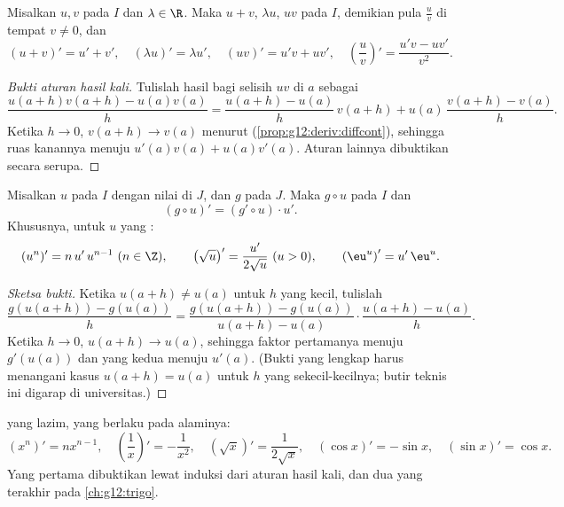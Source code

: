 \begin{proposition}[Operasi]\label{prop:g12:deriv:operations}
Misalkan $u, v$  pada $I$ dan $\lambda \in \R$. Maka $u + v$,
$\lambda u$, $uv$  pada $I$, demikian pula $\frac{u}{v}$ di tempat
$v \neq 0$, dan
\[
(u+v)' = u' + v', \quad (\lambda u)' = \lambda u', \quad
(uv)' = u'v + uv', \quad
\left(\frac{u}{v}\right)' = \frac{u'v - uv'}{v^2}.
\]
\end{proposition}

\begin{proof}[Bukti aturan hasil kali]
Tulislah hasil bagi selisih $uv$ di $a$ sebagai
\[
\frac{u(a+h)v(a+h) - u(a)v(a)}{h}
= \frac{u(a+h) - u(a)}{h}\,v(a+h) + u(a)\,\frac{v(a+h) - v(a)}{h}.
\]
Ketika $h \to 0$, $v(a+h) \to v(a)$ menurut 
(\cref{prop:g12:deriv:diffcont}), sehingga ruas kanannya menuju
$u'(a)v(a) + u(a)v'(a)$. Aturan lainnya dibuktikan secara serupa.
\end{proof}

\begin{theorem}\label{thm:g12:deriv:chain}
Misalkan $u$  pada $I$ dengan nilai di $J$, dan $g$  pada $J$. Maka $g \circ u$  pada $I$ dan
\[
(g \circ u)' = (g' \circ u) \cdot u' .
\]
Khususnya, untuk $u$ yang :
\[
(u^n)' = n\,u'\,u^{n-1} \ (n \in \Z), \qquad
\left(\sqrt{u}\right)' = \frac{u'}{2\sqrt{u}} \ (u > 0), \qquad
\left(\eu^{u}\right)' = u'\,\eu^{u}.
\]
\end{theorem}

\begin{proof}[Sketsa bukti]
Ketika $u(a+h) \neq u(a)$ untuk $h$ yang kecil, tulislah
\[
\frac{g(u(a+h)) - g(u(a))}{h}
= \frac{g(u(a+h)) - g(u(a))}{u(a+h) - u(a)} \cdot \frac{u(a+h) - u(a)}{h}.
\]
Ketika $h \to 0$, $u(a+h) \to u(a)$, sehingga faktor pertamanya menuju
$g'(u(a))$ dan yang kedua menuju $u'(a)$. (Bukti yang lengkap harus menangani
kasus $u(a+h) = u(a)$ untuk $h$ yang sekecil-kecilnya; butir teknis ini
digarap di universitas.)
\end{proof}

\begin{example}
 yang lazim, yang berlaku pada  alaminya:
\[
(x^n)' = nx^{n-1}, \quad
\left(\frac{1}{x}\right)' = -\frac{1}{x^2}, \quad
(\sqrt{x})' = \frac{1}{2\sqrt{x}}, \quad
(\cos x)' = -\sin x, \quad
(\sin x)' = \cos x .
\]
Yang pertama dibuktikan lewat induksi dari aturan hasil kali, dan dua yang
terakhir pada \cref{ch:g12:trigo}.
\end{example}

